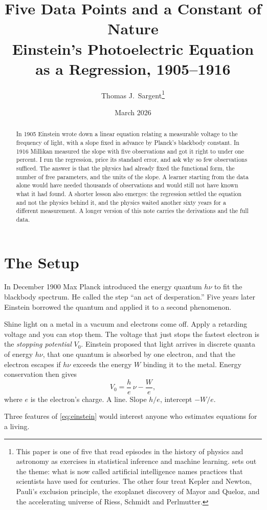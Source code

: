 \documentclass[11pt]{article}
\title{Five Data Points and a Constant of Nature\\[2pt]
       \large Einstein's Photoelectric Equation as a Regression, 1905--1916}
\author{Thomas J.\ Sargent\thanks{%
  This paper is one of five that read episodes in the
  history of physics and astronomy as exercises in statistical inference and
  machine learning.  \citet{sargent2025sources} sets out the theme: what is
  now called artificial intelligence names practices that scientists have used
  for centuries.  The other four treat Kepler and Newton, Pauli's exclusion principle, the
  exoplanet discovery of Mayor and Queloz, and the accelerating universe of
  Riess, Schmidt and Perlmutter.}}
\date{March 2026}
\begin{document}
\maketitle

\begin{abstract}
\noindent
In 1905 Einstein wrote down a linear equation relating a measurable voltage to
the frequency of light, with a slope fixed in advance by Planck's blackbody
constant.  In 1916 Millikan measured the slope with five observations and got
it right to under one percent.  I run the regression, price its standard
error, and ask why so few observations sufficed.  The answer is that the
physics had already fixed the functional form, the number of free parameters,
and the units of the slope.  A learner starting from the data alone would have
needed thousands of observations and would still not have known what it had
found.  A shorter lesson also emerges: the regression settled the equation and
not the physics behind it, and the physics waited another sixty years for a
different measurement.  A longer version of this note carries the derivations
and the full data.
\end{abstract}

\section{The Setup}

In December 1900 Max Planck introduced the energy quantum $h\nu$ to fit the
blackbody spectrum.  He called the step ``an act of desperation.''  Five years
later Einstein borrowed the quantum and applied it to a second phenomenon.

Shine light on a metal in a vacuum and electrons come off.  Apply a retarding
voltage and you can stop them.  The voltage that just stops the fastest
electron is the \emph{stopping potential} $V_0$.  Einstein proposed that light
arrives in discrete quanta of energy $h\nu$, that one quantum is absorbed by
one electron, and that the electron escapes if $h\nu$ exceeds the energy $W$
binding it to the metal.  Energy conservation then gives
\begin{equation}\label{eq:einstein}
  V_0 = \frac{h}{e}\,\nu - \frac{W}{e},
\end{equation}
where $e$ is the electron's charge.  A line.  Slope $h/e$, intercept $-W/e$.

Three features of \eqref{eq:einstein} would interest anyone who estimates
equations for a living.
\end{document}
